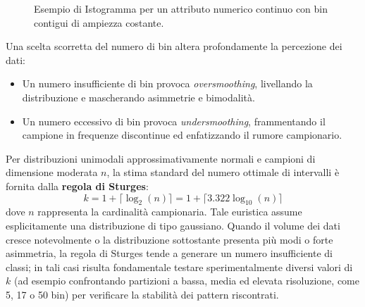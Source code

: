 \begin{figure}[H]
\centering
{}
\caption{Esempio di Istogramma per un attributo numerico continuo con bin contigui di ampiezza costante.}
\label{fig:histogram-example}
\end{figure}

Una scelta scorretta del numero di bin altera profondamente la percezione dei dati:
\begin{itemize}
    \item Un numero insufficiente di bin provoca \textit{oversmoothing}, livellando la distribuzione e mascherando asimmetrie e bimodalit\`a.
    \item Un numero eccessivo di bin provoca \textit{undersmoothing}, frammentando il campione in frequenze discontinue ed enfatizzando il rumore campionario.
\end{itemize}

Per distribuzioni unimodali approssimativamente normali e campioni di dimensione moderata $n$, la stima standard del numero ottimale di intervalli \`e fornita dalla \textbf{regola di Sturges}:
\begin{equation}
k = 1 + \lceil \log_2(n) \rceil = 1 + \lceil 3.322 \log_{10}(n) \rceil
\end{equation}
dove $n$ rappresenta la cardinalit\`a campionaria. Tale euristica assume esplicitamente una distribuzione di tipo gaussiano. Quando il volume dei dati cresce notevolmente o la distribuzione sottostante presenta pi\`u modi o forte asimmetria, la regola di Sturges tende a generare un numero insufficiente di classi; in tali casi risulta fondamentale testare sperimentalmente diversi valori di $k$ (ad esempio confrontando partizioni a bassa, media ed elevata risoluzione, come 5, 17 o 50 bin) per verificare la stabilit\`a dei pattern riscontrati.

